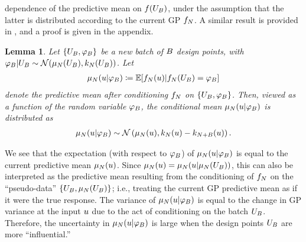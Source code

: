 \documentclass[12pt]{article}
\newtheorem{lemma}{Lemma}
\begin{document}
dependence of the predictive mean on $\func(\designBatchIn)$, under the assumption that the latter is distributed according 
to the current GP $\funcEm[\Ndesign]$. A similar result is provided in \cite{VehtariParallelGP}, and a proof is given in 
the appendix.
\begin{lemma} \label{lemma:pred-mean-dist}
Let $\{\designBatchIn, \funcVal[\Nbatch]\}$ be a new batch of $\Nbatch$ design points, with
$\designBatchFunc | \designBatchIn \sim \Gaussian(\gpMean[\Ndesign](\designBatchIn), \gpKer[\Ndesign](\designBatchIn))$. 
Let  
\begin{align}
\gpMean[\Ndesign](\Par | \designBatchFunc) 
\Def \E[\funcEm[\Ndesign](\Par) | \funcEm[\Ndesign](\designBatchIn) = \designBatchFunc] \label{conditional-mean-notation}
\end{align}
denote the predictive mean after conditioning $\funcEm[\Ndesign]$ on 
$\{\designBatchIn, \funcVal[\Nbatch]\}$. Then, viewed as a function of the random variable 
$\designBatchFunc$, the conditional mean $\gpMean[\Ndesign](\Par| \designBatchFunc)$ is 
distributed as 
\begin{align}
\gpMean[\Ndesign](\Par | \designBatchFunc)
\sim \Gaussian\left(\gpMean[\Ndesign](\Par), 
                               \gpKer[\Ndesign](\Par) - \gpKer[\Naugment](\Par) \right) \label{pred-mean-dist}.
\end{align}
\end{lemma}
We see that the expectation (with respect to $\designBatchFunc$) of $\gpMean[\Ndesign](\Par| \designBatchFunc)$ 
is equal to the current predictive mean $\gpMean[\Ndesign](\Par)$. Since 
$\gpMean[\Ndesign](\Par) = \gpMean[\Ndesign](\Par | \gpMean[\Ndesign](\designBatchIn))$, this can also be 
interpreted as the predictive mean resulting from the conditioning of $\funcEm[\Ndesign]$ on the ``pseudo-data''
$\{\designBatchIn, \gpMean[\Ndesign](\designBatchIn)\}$; i.e., treating the current GP predictive mean as if it were 
the true response. The variance of 
$\gpMean[\Ndesign](\Par | \designBatchFunc)$ is equal to the change in GP variance at the input $\Par$ due to the act 
of conditioning on the batch $\designBatchIn$. Therefore, the uncertainty in $\gpMean[\Ndesign](\Par | \designBatchFunc)$ 
is large when the design points $\designBatchIn$ are more ``influential.''
\end{document}
